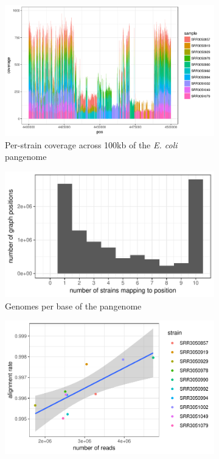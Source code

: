 \begin{figure}[htbp!]
  \centering
  \begin{subfigure}[t]{1.0\textwidth}
    \includegraphics[width=1.0\textwidth]{Chapter3/Figs/ecoli_10strain_cov_col_pos_4400000_100k.png}
    \caption{Per-strain coverage across 100kb of the \emph{E. coli} pangenome}
    \label{subfig:ecoli_cov_100k}
  \end{subfigure}
  \begin{subfigure}[t]{0.49\textwidth}
    \includegraphics[width=1.0\textwidth]{Chapter3/Figs/ecoli_cov_strains_hist.pdf}
    \caption{Genomes per base of the pangenome}
    \label{subfig:ecoli_cov_strains}
  \end{subfigure}
  \begin{subfigure}[t]{0.49\textwidth}
    \includegraphics[width=1.0\textwidth]{Chapter3/Figs/ecoli_pangenome_alignment_rate_vs_depth.pdf}

\end{subfigure}
\end{figure}
